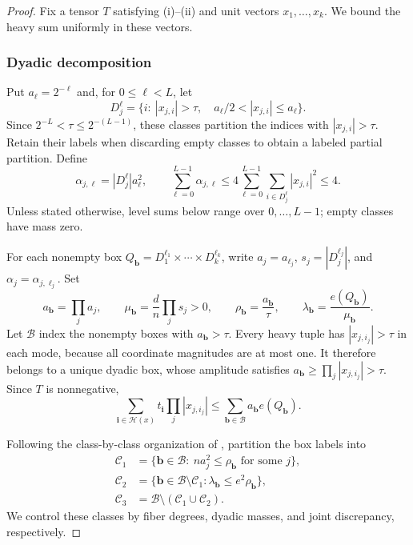 \documentclass[10pt,a4paper]{amsart}
\numberwithin{equation}{section}
\begin{document}
\begin{proof}
Fix a tensor $T$ satisfying \textup{(i)}--\textup{(ii)} and unit vectors
$x_1,\ldots,x_k$. We bound the heavy sum uniformly in these vectors.

\subsubsection*{Dyadic decomposition}
Put $a_\ell=2^{-\ell}$ and, for $0\le\ell<L$, let
\[
 D_j^\ell=\{i:\ |x_{j,i}|>\tau,\quad a_\ell/2<|x_{j,i}|\le a_\ell\}.
\]
Since $2^{-L}<\tau\le2^{-(L-1)}$, these classes partition the indices
with $|x_{j,i}|>\tau$. Retain their labels when discarding empty
classes to obtain a labeled partial partition. Define
\begin{equation}\label{eq:alpha}
 \alpha_{j,\ell}=|D_j^\ell|a_\ell^2,\qquad
 \sum_{\ell=0}^{L-1}\alpha_{j,\ell}
 \le4\sum_{\ell=0}^{L-1}\sum_{i\in D_j^\ell}|x_{j,i}|^2
 \le4.
\end{equation}
Unless stated otherwise, level sums below range over $0,\ldots,L-1$;
empty classes have mass zero.

For each nonempty box $Q_{\mathbf b}=D_1^{\ell_1}\times\cdots\times D_k^{\ell_k}$,
write $a_j=a_{\ell_j}$, $s_j=|D_j^{\ell_j}|$, and
$\alpha_j=\alpha_{j,\ell_j}$. Set
\begin{equation}\label{eq:box-parameters}
 a_{\mathbf b}=\prod_j a_j,\qquad
 \mu_{\mathbf b}=\frac dn\prod_j s_j>0,\qquad
 \rho_{\mathbf b}=\frac{a_{\mathbf b}}{\tau},\qquad
 \lambda_{\mathbf b}=\frac{e(Q_{\mathbf b})}{\mu_{\mathbf b}}.
\end{equation}
Let $\mathcal B$ index the nonempty boxes with $a_{\mathbf b}>\tau$.
Every heavy tuple has $|x_{j,i_j}|>\tau$ in each mode, because all
coordinate magnitudes are at most one. It therefore belongs to a
unique dyadic box, whose amplitude satisfies
$a_{\mathbf b}\ge\prod_j|x_{j,i_j}|>\tau$. Since $T$ is nonnegative,
\begin{equation}\label{eq:heavy-box-domination}
 \sum_{\mathbf i\in\mathcal H(x)}t_{\mathbf i}\prod_j|x_{j,i_j}|
 \le\sum_{\mathbf b\in\mathcal B}a_{\mathbf b}e(Q_{\mathbf b}).
\end{equation}

Following the class-by-class organization of \cite[Section~4.3]{ZZ21},
partition the box labels into
\begin{align*}
 \mathcal C_1
 &=\{\mathbf b\in\mathcal B:\ na_j^2\le\rho_{\mathbf b}
                                      \text{ for some }j\},\\
 \mathcal C_2
 &=\{\mathbf b\in\mathcal B\setminus\mathcal C_1:
                               \lambda_{\mathbf b}\le e^2\rho_{\mathbf b}\},\\
 \mathcal C_3&=\mathcal B\setminus(\mathcal C_1\cup\mathcal C_2).
\end{align*}
We control these classes by fiber degrees, dyadic masses, and joint
discrepancy, respectively.


\end{proof}
\end{document}
